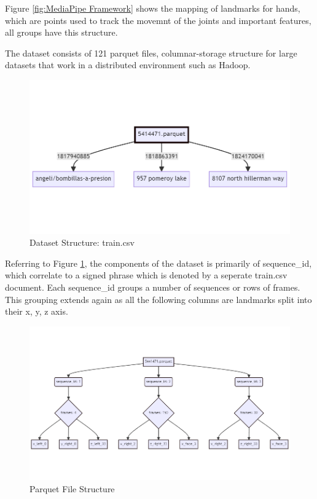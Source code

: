 \documentclass[preprint,11pt,review,authoryear]{elsarticle}
\begin{document}
Figure \ref{fig:MediaPipe Framework} shows the mapping of landmarks for hands, which are points used to track the movemnt of the joints and important features, all groups have this structure.

The dataset consists of 121 parquet files, columnar-storage structure for large datasets that work in a distributed environment such as Hadoop. 

\begin{figure}[h]
    \centering
    \includegraphics[width=1\textwidth]{images/parquet_structure_1.png}
    \caption{Dataset Structure: train.csv}
    \label{fig:Dataset Structure}
\end{figure}

Referring to Figure \ref{fig:Dataset Structure}, the components of the dataset is primarily of sequence_id, which correlate to a signed phrase which is denoted by a seperate train.csv document. Each sequence_id groups a number of sequences or rows of frames. This grouping extends again as all the following columns are landmarks split into their x, y, z axis.


\begin{figure}[h]
    \centering
    \includegraphics[width=1\textwidth]{images/parquet_structure_2.png}
    \caption{Parquet File Structure}
    \label{fig:Parquet File Structure}
\end{figure}
\end{document}
